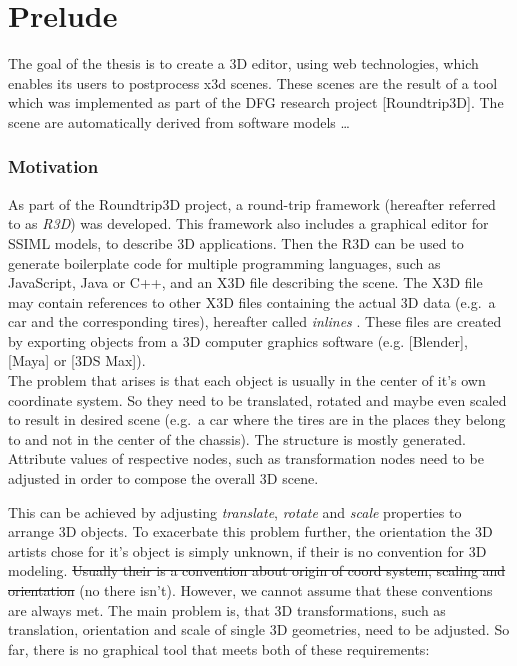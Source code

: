 \section{Prelude}
\label{sec:Prelude}

The goal of the thesis is to create a 3D editor, using web technologies,
which enables its users to postprocess x3d scenes. These scenes are the
result of a tool which was implemented as part of the DFG research
project {[}Roundtrip3D{]}. The scene are automatically derived from
software models \ldots{}

\subsubsection{Motivation}\label{motivation}

As part of the Roundtrip3D project, a round-trip framework (hereafter
referred to as \emph{R3D}) was developed. This framework also includes a
graphical editor for SSIML models, to describe 3D applications. Then the
R3D can be used to generate boilerplate code for multiple programming
languages, such as JavaScript, Java or C++, and an X3D file describing
the scene. The X3D file may contain references to other X3D files
containing the actual 3D data (e.g.~a car and the corresponding tires),
hereafter called \emph{inlines} . These files are created by exporting
objects from a 3D computer graphics software (e.g. {[}Blender{]},
{[}Maya{]} or {[}3DS Max{]}).\\
The problem that arises is that each object is usually in the center of
it's own coordinate system. So they need to be translated, rotated and
maybe even scaled to result in desired scene (e.g.~a car where the tires
are in the places they belong to and not in the center of the chassis).
The structure is mostly generated. Attribute values of respective nodes,
such as transformation nodes need to be adjusted in order to compose the
overall 3D scene.


This can be achieved by adjusting \emph{translate}, \emph{rotate} and
\emph{scale} properties to arrange 3D objects. To exacerbate this
problem further, the orientation the 3D artists chose for it's object is
simply unknown, if their is no convention for 3D modeling. \sout{Usually
their is a convention about origin of coord system, scaling and
orientation} (no there isn't). However, we cannot assume that these
conventions are always met. The main problem is, that 3D
transformations, such as translation, orientation and scale of single 3D
geometries, need to be adjusted. So far, there is no graphical tool that
meets both of these requirements:

